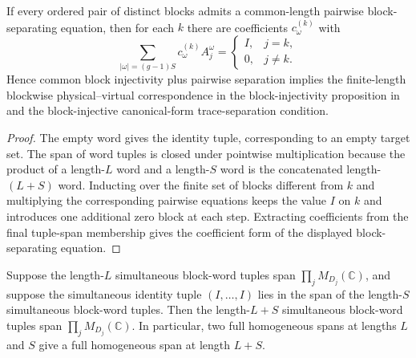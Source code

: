 \begin{lemma}
    \label{lem:block_separating_equations_from_pairwise_separation}
    \leanok
    If every ordered pair of distinct blocks admits a common-length pairwise
    block-separating equation, then for each $k$ there are coefficients
    $c_\omega^{(k)}$ with
    \[
        \sum_{|\omega|=(g-1)S} c_\omega^{(k)} A_j^\omega
        =
        \begin{cases}
            I, & j=k,\\
            0, & j\ne k.
        \end{cases}
    \]
    Hence common block injectivity plus pairwise separation implies the
    finite-length blockwise physical--virtual correspondence in the
    block-injectivity proposition in \cite[lines~340--345]{Cirac2016MPDO_arXiv}
    and the block-injective canonical-form trace-separation condition.
\end{lemma}

\begin{proof}
    \leanok
    The empty word gives the identity tuple, corresponding to an empty target set.
    The span of word tuples is closed under pointwise multiplication because the
    product of a length-$L$ word and a length-$S$ word is the concatenated
    length-$(L+S)$ word. Inducting over the finite set of blocks different from
    $k$ and multiplying the corresponding pairwise equations keeps the value $I$
    on $k$ and introduces one additional zero block at each step. Extracting
    coefficients from the final tuple-span membership gives the coefficient form
    of the displayed block-separating equation.
\end{proof}

\begin{lemma}
    \label{lem:homogeneous_word_tuple_span_padding}
    \leanok
    Suppose the length-\(L\) simultaneous block-word tuples span
    \(\prod_j M_{D_j}(\mathbb C)\), and suppose the simultaneous identity tuple
    \((I,\ldots,I)\) lies in the span of the length-\(S\) simultaneous
    block-word tuples. Then the length-\(L+S\) simultaneous block-word tuples
    span \(\prod_j M_{D_j}(\mathbb C)\). In particular, two full homogeneous
    spans at lengths \(L\) and \(S\) give a full homogeneous span at length
    \(L+S\).
\end{lemma}

